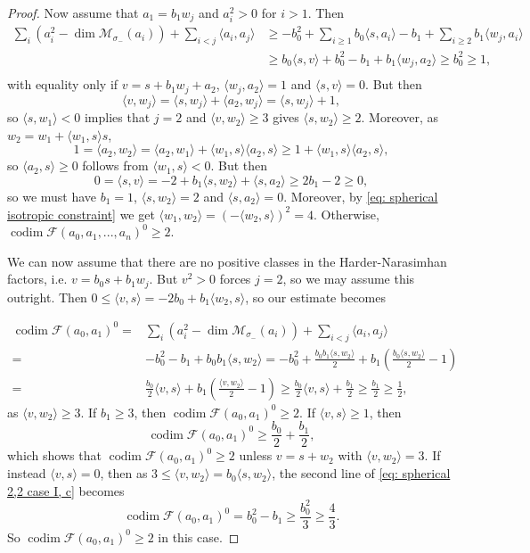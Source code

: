 \documentclass[leqno,11pt]{amsart}
\def\codim{\mathop{\mathrm{codim}}\nolimits}
\def\dim{\mathop{\mathrm{dim}}\nolimits}
\theoremstyle{definition}
\def\FF{\ensuremath{\mathcal F}}
\def\MM{\ensuremath{\mathcal M}}
\begin{document}
\begin{proof}
Now assume that $a_1=b_1 w_j$ and $a_i^2>0$ for $i>1$.  Then 
\begin{equation}
\begin{split}
 \sum_i (a_i^2-\dim \MM_{\sigma_-}(a_i))+\sum_{i<j}\langle a_i,a_j \rangle
& \geq  -b_0^2+\sum_{i \geq 1}b_0 \langle s,a_i \rangle
-b_1
+\sum_{i \geq 2} b_1 \langle w_j,a_i \rangle\\
& \geq  b_0 \langle s,v \rangle+b_0^2
-b_1+b_1 \langle w_j,a_2 \rangle 
\geq  b_0^2 \geq 1,\\
\end{split}
\end{equation}
with equality only if $v=s+b_1w_j+a_2$, $\langle w_j,a_2\rangle=1$ and $\langle s,v\rangle=0$.  But then $$\langle v,w_j\rangle=\langle s,w_j\rangle+\langle a_2,w_j\rangle=\langle s,w_j\rangle+1,$$ so $\langle s,w_1\rangle<0$ implies that $j=2$ and $\langle v,w_2\rangle\geq 3$ gives $\langle s,w_2\rangle\geq 2$.  Moreover, as $w_2=w_1+\langle w_1,s\rangle s$, $$1=\langle a_2,w_2\rangle=\langle a_2,w_1\rangle+\langle w_1,s\rangle\langle a_2,s\rangle\geq 1+\langle w_1,s\rangle\langle a_2,s\rangle,$$ so $\langle a_2,s\rangle\geq 0$ follows from $\langle w_1,s\rangle<0$.  But then $$0=\langle s,v\rangle=-2+b_1\langle s,w_2\rangle+\langle s,a_2\rangle\geq 2b_1-2\geq 0,$$ so we must have $b_1=1$, $\langle s,w_2\rangle=2$ and $\langle s,a_2\rangle=0$.  Moreover, by \eqref{eq: spherical isotropic constraint} we get $\langle w_1,w_2\rangle=(-\langle w_2,s\rangle)^2=4$.  Otherwise, $\codim\FF(a_0,a_1,...,a_n)^0\geq 2$.

We can now assume that there are no positive classes in the Harder-Narasimhan factors, i.e. $v=b_0 s+b_1 w_j$.  But $v^2>0$ forces $j=2$, so we may assume this outright.  Then $0 \leq \langle v,s \rangle=-2b_0+b_1 \langle w_2,s \rangle$, so our estimate becomes 

 \begin{equation}\label{eq: spherical 2,2 case I, c}
\begin{split}
\codim\FF(a_0,a_1)^0=&\sum_i (a_i^2-\dim \MM_{\sigma_-}(a_i))+\sum_{i<j}\langle a_i,a_j \rangle\\
= & -b_0^2-b_1+b_0b_1\langle s,w_2\rangle=-b_0^2+\frac{b_0b_1\langle s,w_2\rangle}{2}+b_1\left(\frac{b_0\langle s,w_2\rangle}{2}-1\right)\\
= & \frac{b_0}{2}\langle v,s\rangle+b_1\left(\frac{\langle v,w_2\rangle}{2}-1\right)\geq \frac{b_0}{2}\langle v,s\rangle+\frac{b_1}{2}\geq \frac{b_1}{2}\geq\frac{1}{2},
\end{split}
\end{equation}
as $\langle v,w_2\rangle\geq 3$.  If $b_1\geq 3$, then $\codim\FF(a_0,a_1)^0\geq 2$.  If $\langle v,s\rangle\geq 1$, then $$\codim\FF(a_0,a_1)^0\geq \frac{b_0}{2}+\frac{b_1}{2},$$ which shows that $\codim\FF(a_0,a_1)^0\geq 2$ unless $v=s+w_2$ with $\langle v,w_2\rangle=3$.  If instead $\langle v,s\rangle=0$, then as $3\leq\langle v,w_2\rangle=b_0\langle s,w_2\rangle$, the second line of \eqref{eq: spherical 2,2 case I, c} becomes $$\codim\FF(a_0,a_1)^0=b_0^2-b_1\geq\frac{b_0^2}{3}\geq\frac{4}{3}.$$    So $\codim\FF(a_0,a_1)^0\geq 2$ in this case. 


\end{proof}
\end{document}
